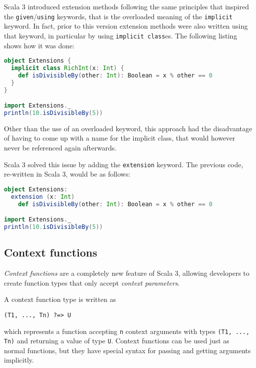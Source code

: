 Scala 3 introduced extension methods following the same principles that inspired the \texttt{given}/\texttt{using} keywords, that is the overloaded meaning of the \texttt{implicit} keyword.
%
In fact, prior to this version extension methods were also written using that keyword, in particular by using \texttt{implicit class}es.
%
The following listing shows how it was done:
%
\begin{lstlisting}[frame=single, language=scala]
object Extensions {
  implicit class RichInt(x: Int) {
    def isDivisibleBy(other: Int): Boolean = x % other == 0
  }
}

import Extensions._
println(10.isDivisibleBy(5))
\end{lstlisting}
%
Other than the use of an overloaded keyword, this approach had the disadvantage of having to come up with a name for the implicit class, that would however never be referenced again afterwards.

Scala 3 solved this issue by adding the \texttt{extension} keyword.
%
The previous code, re-written in Scala 3, would be as follows:
%
\begin{lstlisting}[frame=single, language=scala]
object Extensions:
  extension (x: Int)
    def isDivisibleBy(other: Int): Boolean = x % other == 0

import Extensions._
println(10.isDivisibleBy(5))
\end{lstlisting}

\subsection{Context functions}
\label{sec:context-functions}

\textit{Context functions} are a completely new feature of Scala 3, allowing developers to create function types that only accept \textit{context parameters}.

A context function type is written as
\begin{verbatim}
(T1, ..., Tn) ?=> U
\end{verbatim}
which represents a function accepting \texttt{n} context arguments with types \texttt{(T1, ..., Tn)} and returning a value of type \texttt{U}.
%
Context functions can be used just as normal functions, but they have special syntax for passing and getting arguments implicitly.

